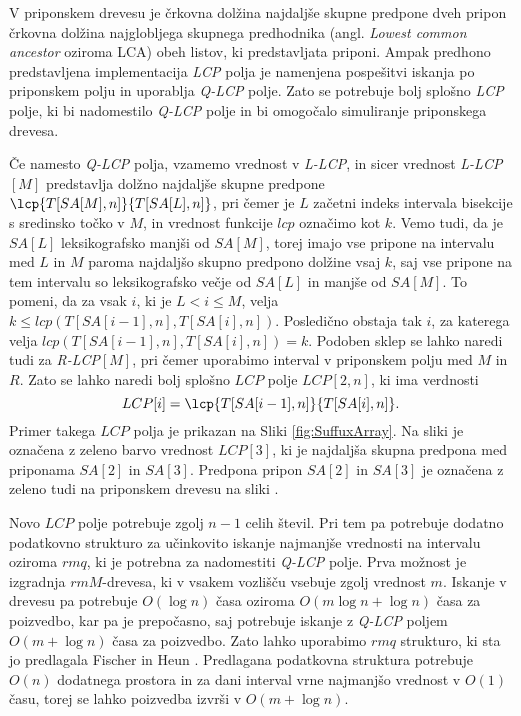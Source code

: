 V priponskem drevesu je črkovna dolžina najdaljše skupne predpone dveh pripon črkovna dolžina najglobljega skupnega predhodnika (angl. \textit{Lowest common ancestor} oziroma LCA) obeh listov, ki predstavljata priponi. Ampak predhono predstavljena implementacija \textit{LCP} polja je namenjena pospešitvi iskanja po priponskem polju in uporablja \textit{Q-LCP} polje. Zato se potrebuje bolj splošno \textit{LCP} polje, ki bi nadomestilo \textit{Q-LCP} polje in bi omogočalo simuliranje priponskega drevesa.

Če namesto \textit{Q-LCP} polja, vzamemo vrednost v \textit{L-LCP}, in sicer vrednost \textit{L-LCP}$[M]$ predstavlja dolžno najdaljše skupne predpone $\lcp{T[SA[M], n]}{T[SA[L], n]}$, pri čemer je $L$ začetni indeks intervala bisekcije s sredinsko točko v $M$, in vrednost funkcije $lcp$ označimo kot $k$. Vemo tudi, da je $SA[L]$ leksikografsko manjši od $SA[M]$, torej imajo vse pripone na intervalu med $L$ in $M$ paroma najdaljšo skupno predpono dolžine vsaj $k$, saj vse pripone na tem intervalu so leksikografsko večje od $SA[L]$ in manjše od $SA[M]$. To pomeni, da za vsak $i$, ki je $L<i\le M$, velja $k\le lcp(T[SA[i-1], n], T[SA[i], n])$. Posledično obstaja tak $i$, za katerega velja $lcp(T[SA[i-1], n], T[SA[i], n])=k$. Podoben sklep se lahko naredi tudi za \textit{R-LCP}$[M]$, pri čemer uporabimo interval v priponskem polju med $M$ in $R$. Zato se lahko naredi bolj splošno $LCP$ polje $LCP[2,n]$, ki ima verdnosti 
$$
    LCP[i]=\lcp{T[SA[i-1], n]}{T[SA[i], n]}.
$$
Primer takega $LCP$ polja je prikazan na Sliki \ref{fig:SuffuxArray}. Na sliki je označena z zeleno barvo vrednost $LCP[3]$, ki je najdaljša skupna predpona med priponama $SA[2]$ in $SA[3]$. Predpona pripon $SA[2]$ in $SA[3]$ je označena z zeleno tudi na priponskem drevesu na sliki \cite{Abouelhoda2004, Kasai2001}.

Novo $LCP$ polje potrebuje zgolj $n-1$ celih števil. Pri tem pa potrebuje dodatno podatkovno strukturo za učinkovito iskanje najmanjše vrednosti na intervalu oziroma $rmq$, ki je potrebna za nadomestiti \textit{Q-LCP} polje. Prva možnost je izgradnja $rmM$-drevesa, ki v vsakem vozlišču vsebuje zgolj vrednost $m$. Iskanje v drevesu pa potrebuje $O(\log{n})$ časa oziroma $O(m\log{n}+\log{n})$ časa za poizvedbo, kar pa je prepočasno, saj potrebuje iskanje z \textit{Q-LCP} poljem $O(m+\log{n})$ časa za poizvedbo. Zato lahko uporabimo $rmq$ strukturo, ki sta jo predlagala Fischer in Heun \cite{Fischer2007}. Predlagana podatkovna struktura potrebuje $O(n)$ dodatnega prostora in za dani interval vrne najmanjšo vrednost v $O(1)$ času, torej se lahko poizvedba izvrši v $O(m+\log{n})$.

